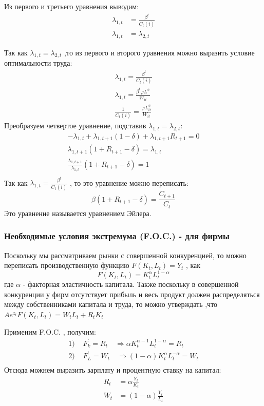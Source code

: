 \documentclass[a4paper,12pt]{article}
\begin{document}
{Из первого и третьего уравнения выводим:
\begin{align*}
    \lambda_{1,t} &= \frac{\beta^{t}}{C_t(i)}    \\
    \lambda_{1,t} &= \lambda_{2,t}
\end{align*}

Так как  $ \lambda_{1,t} = \lambda_{2,t}$ ,то из первого и второго уравнения можно выразить условие оптимальности труда:
\begin{align*}
    \lambda_{1,t} = \frac{\beta^{t}}{C_t(i)} \\
    \lambda_{1,t} = \frac{\beta^{t} \varphi L^{\psi}}{W_{it}} \\
    \frac{1}{C_{t}(i)} = \frac{\varphi L_{it}^\psi}{W_{it}}
\end{align*}
Преобразуем четвертое уравнение, подставив $\lambda_{1,t} = \lambda_{2,t}$:
\begin{align*}
    -\lambda_{1,t} + \lambda_{1,t+1}(1-\delta) + \lambda_{1,t+1}R_{t+1} = 0  \\
    \lambda_{1,t+1}(1+R_{t+1}-\delta) = \lambda_{1,t}  \\
    \frac{\lambda_{1,t+1}}{\lambda_{1,t}}(1+R_{t+1}-\delta)  = 1 \\ 
\end{align*}
Так как $\lambda_{1,t} = \frac{\beta^{t}}{C_t(i)}$ , то это уравнение можно переписать:
\[
    \beta(1+R_{t+1}-\delta)  = \frac{C_{t+1}}{C_{t}}
\]
Это уравнение называется уравнением Эйлера.



\subsubsection{Необходимые условия экстремума (F.O.C.) - для фирмы}
Поскольку мы рассматриваем рынки с совершенной конкуренцией, то можно переписать производственную функцию $F(K_t, L_t) = Y_t$ , как 
\[ 
    F(K_t, L_t) = K^{\alpha}_{t}L^{1-\alpha}_{t}
\] 
где $\alpha$ - факторная эластичность капитала.
Также поскольку в совершенной конкуренции у фирм отсутствует прибыль и весь продукт должен распределяться между собственниками капитала и труда, то можно утверждать ,что $Ae^{z_{t}}F(K_t, L_t) = W_{t}L_{t} + R_{t}K_{t}$

Применим F.O.C. , получим:
\begin{align*}
    \text{1) } & F^{'}_{k} = R_{t} \quad \Rightarrow \alpha K^{\alpha-1}_{t}L^{1-\alpha}_{t} = R_{t} \\
    \text{2) } & F^{'}_{L} =  W_t \quad  \Rightarrow (1-\alpha)K^{\alpha}_{t}L^{-\alpha}_{t} = W_t   \\
\end{align*}
Отсюда можнем выразить зарплату и процентную ставку на капитал:
\begin{align}
    R_t &= \alpha \frac{Y_t}{K_t} \label{eq:capital_share} \\
    W_t &= (1-\alpha) \frac{Y_t}{L_t} \label{eq:labor_share}
\end{align}

}
\end{document}
